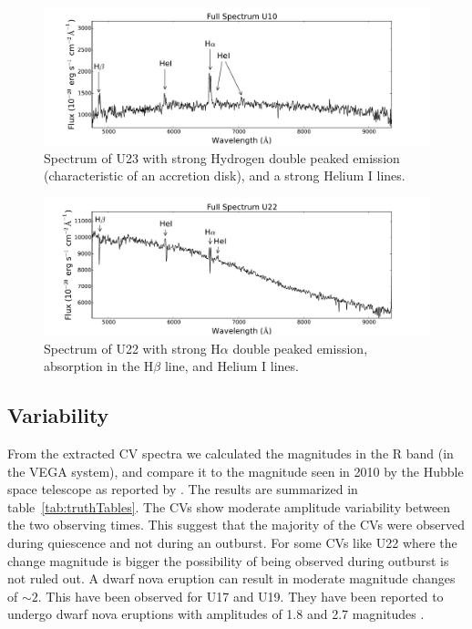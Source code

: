 \begin{figure}[h]
        \centering
        \includegraphics[scale=.5]{assets/images/U10full.pdf}
\caption{Spectrum of U23 with strong Hydrogen double peaked emission (characteristic of an accretion disk), and a strong Helium I lines. }
\label{fig:U10spectra}
\end{figure}

\begin{figure}[h!]
        \centering
        \includegraphics[scale=.5]{assets/images/U22full.pdf}
\caption{Spectrum of U22 with strong H$\alpha$ double peaked emission, absorption in the H$\beta$ line, and Helium I lines.}
\label{fig:U22spectra}
\end{figure}



\subsection{Variability}

From the extracted CV spectra we calculated the magnitudes in the R band (in the VEGA system), and compare it to the magnitude seen in 2010 by the Hubble space telescope as reported by \cite{cohn_identification_2010}. The results are summarized in table~\ref{tab:truthTables}. The CVs show moderate amplitude variability between the two observing times. This suggest that the majority of the CVs were observed during quiescence and not during an outburst. For some CVs like U22 where the change magnitude is bigger the possibility of being observed during outburst is not ruled out. A dwarf nova eruption can result in moderate magnitude changes of $\sim 2$. This have been observed for U17 and U19. They have been reported to undergo dwarf nova eruptions with amplitudes of 1.8 and 2.7 magnitudes \citep{shara_erupting_2005}. 

